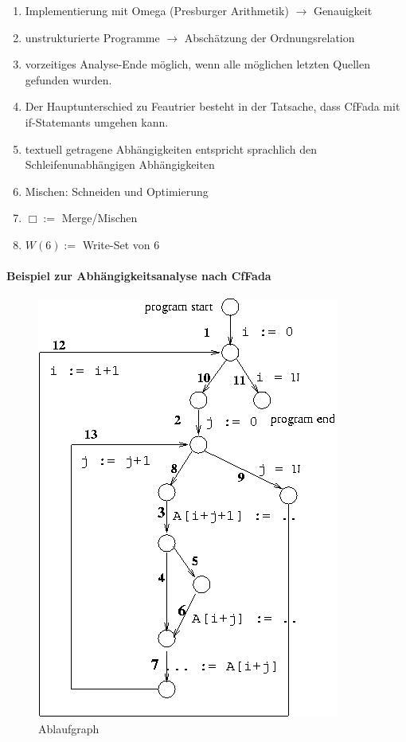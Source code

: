 \begin{enumerate}
    \item Implementierung mit Omega (Presburger Arithmetik) \( \rightarrow \) Genauigkeit
    \item unstrukturierte Programme \( \rightarrow \) Abschätzung der Ordnungsrelation
    \item vorzeitiges Analyse-Ende möglich, wenn alle möglichen letzten Quellen gefunden wurden.
    \item Der Hauptunterschied zu Feautrier besteht in der Tatsache, dass CfFada mit if-Statemants umgehen kann.
    \item textuell getragene Abhängigkeiten entspricht sprachlich den Schleifenunabhängigen Abhängigkeiten
    \item Mischen: Schneiden und Optimierung
    \item \( \Box := \) Merge/Mischen
    \item \( W(6) := \) Write-Set von 6
\end{enumerate}


\paragraph{Beispiel zur Abhängigkeitsanalyse nach CfFada}

\begin{figure}
    \begin{flushright}
        \includegraphics[scale=0.5]{images/cffada.png}
        \caption{Ablaufgraph}
        \vspace{+40pt}
    \end{flushright}

\end{figure}

